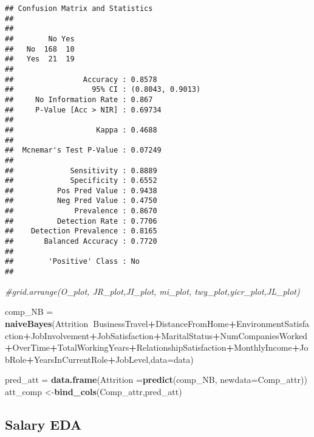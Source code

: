 \documentclass[
]{article}
\newenvironment{Shaded}{\begin{snugshade}}{\end{snugshade}}
\newcommand{\CommentTok}[1]{\textcolor[rgb]{0.56,0.35,0.01}{\textit{#1}}}
\newcommand{\DataTypeTok}[1]{\textcolor[rgb]{0.13,0.29,0.53}{#1}}
\newcommand{\KeywordTok}[1]{\textcolor[rgb]{0.13,0.29,0.53}{\textbf{#1}}}
\newcommand{\NormalTok}[1]{#1}
\newcommand{\OperatorTok}[1]{\textcolor[rgb]{0.81,0.36,0.00}{\textbf{#1}}}
\newcommand{\StringTok}[1]{\textcolor[rgb]{0.31,0.60,0.02}{#1}}
\begin{document}
\begin{verbatim}
## Confusion Matrix and Statistics
## 
##      
##        No Yes
##   No  168  10
##   Yes  21  19
##                                           
##                Accuracy : 0.8578          
##                  95% CI : (0.8043, 0.9013)
##     No Information Rate : 0.867           
##     P-Value [Acc > NIR] : 0.69734         
##                                           
##                   Kappa : 0.4688          
##                                           
##  Mcnemar's Test P-Value : 0.07249         
##                                           
##             Sensitivity : 0.8889          
##             Specificity : 0.6552          
##          Pos Pred Value : 0.9438          
##          Neg Pred Value : 0.4750          
##              Prevalence : 0.8670          
##          Detection Rate : 0.7706          
##    Detection Prevalence : 0.8165          
##       Balanced Accuracy : 0.7720          
##                                           
##        'Positive' Class : No              
## 
\end{verbatim}

\begin{Shaded}
\begin{Highlighting}[]
\CommentTok{#grid.arrange(O_plot, JR_plot,JI_plot, mi_plot, twy_plot,yicr_plot,JL_plot)}

\NormalTok{comp_NB =}\StringTok{ }\KeywordTok{naiveBayes}\NormalTok{(Attrition}\OperatorTok{~}\NormalTok{BusinessTravel}\OperatorTok{+}\NormalTok{DistanceFromHome}\OperatorTok{+}\NormalTok{EnvironmentSatisfaction}\OperatorTok{+}\NormalTok{JobInvolvement}\OperatorTok{+}\NormalTok{JobSatisfaction}\OperatorTok{+}\NormalTok{MaritalStatus}\OperatorTok{+}\NormalTok{NumCompaniesWorked}\OperatorTok{+}\NormalTok{OverTime}\OperatorTok{+}\NormalTok{TotalWorkingYears}\OperatorTok{+}\NormalTok{RelationshipSatisfaction}\OperatorTok{+}\NormalTok{MonthlyIncome}\OperatorTok{+}\NormalTok{JobRole}\OperatorTok{+}\NormalTok{YearsInCurrentRole}\OperatorTok{+}\NormalTok{JobLevel,}\DataTypeTok{data=}\NormalTok{data)}

\NormalTok{pred_att =}\StringTok{ }\KeywordTok{data.frame}\NormalTok{(}\DataTypeTok{Attrition =}\KeywordTok{predict}\NormalTok{(comp_NB, }\DataTypeTok{newdata=}\NormalTok{Comp_attr))}
\NormalTok{att_comp <-}\KeywordTok{bind_cols}\NormalTok{(Comp_attr,pred_att)}
\end{Highlighting}
\end{Shaded}

\hypertarget{salary-eda}{%
\subsection{Salary EDA}\label{salary-eda}}
\end{document}
